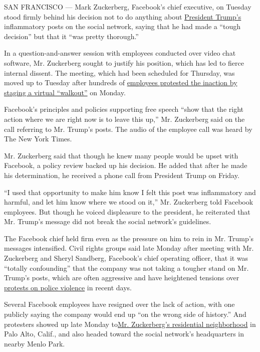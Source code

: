 SAN FRANCISCO --- Mark Zuckerberg, Facebook's chief executive, on
Tuesday stood firmly behind his decision not to do anything about
\href{https://www.nytimes3xbfgragh.onion/2020/06/02/us/politics/trump-bible-photo-op.html}{President
Trump's} inflammatory posts on the social network, saying that he had
made a ``tough decision'' but that it ``was pretty thorough.''

In a question-and-answer session with employees conducted over video
chat software, Mr. Zuckerberg sought to justify his position, which has
led to fierce internal dissent. The meeting, which had been scheduled
for Thursday, was moved up to Tuesday after hundreds of
\href{https://www.nytimes3xbfgragh.onion/2020/06/01/technology/facebook-employee-protest-trump.html}{employees
protested the inaction by staging a virtual ``walkout''} on Monday.

Facebook's principles and policies supporting free speech ``show that
the right action where we are right now is to leave this up,'' Mr.
Zuckerberg said on the call referring to Mr. Trump's posts. The audio of
the employee call was heard by The New York Times.

Mr. Zuckerberg said that though he knew many people would be upset with
Facebook, a policy review backed up his decision. He added that after he
made his determination, he received a phone call from President Trump on
Friday.

``I used that opportunity to make him know I felt this post was
inflammatory and harmful, and let him know where we stood on it,'' Mr.
Zuckerberg told Facebook employees. But though he voiced displeasure to
the president, he reiterated that Mr. Trump's message did not break the
social network's guidelines.

The Facebook chief held firm even as the pressure on him to rein in Mr.
Trump's messages intensified. Civil rights groups said late Monday after
meeting with Mr. Zuckerberg and Sheryl Sandberg, Facebook's chief
operating officer, that it was ``totally confounding'' that the company
was not taking a tougher stand on Mr. Trump's posts, which are often
aggressive and have heightened tensions over
\href{https://www.nytimes3xbfgragh.onion/news-event/george-floyd-protests-minneapolis-new-york-los-angeles?action=click\&pgtype=Article\&state=default\&module=styln-george-floyd\&variant=show\&region=TOP_BANNER\&context=storylines_menu}{protests
on police violence} in recent days.

Several Facebook employees have resigned over the lack of action, with
one publicly saying the company would end up ``on the wrong side of
history.'' And protesters showed up late Monday
to\href{https://padailypost.com/2020/06/02/nighttime-protest-blocked-near-police-station-demonstrators-also-go-to-zuckerbergs-house/}{Mr.
Zuckerberg's residential neighborhood} in Palo Alto, Calif., and also
headed toward the social network's headquarters in nearby Menlo Park.

